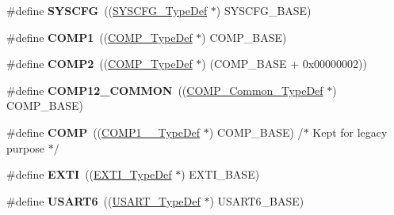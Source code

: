 \begin{DoxyCompactItemize}
\item 
\mbox{\label{group___peripheral__declaration_ga3c833fe1c486cb62250ccbca32899cb8}} 
\#define {\bfseries S\+Y\+S\+C\+FG}~((\hyperlink{struct_s_y_s_c_f_g___type_def}{S\+Y\+S\+C\+F\+G\+\_\+\+Type\+Def} $\ast$) S\+Y\+S\+C\+F\+G\+\_\+\+B\+A\+SE)
\item 
\mbox{\label{group___peripheral__declaration_gaf5713f83009027d48805b049d55bb01b}} 
\#define {\bfseries C\+O\+M\+P1}~((\hyperlink{struct_c_o_m_p___type_def}{C\+O\+M\+P\+\_\+\+Type\+Def} $\ast$) C\+O\+M\+P\+\_\+\+B\+A\+SE)
\item 
\mbox{\label{group___peripheral__declaration_ga6985fa7e9bb3c2edf15b29b7af210a2b}} 
\#define {\bfseries C\+O\+M\+P2}~((\hyperlink{struct_c_o_m_p___type_def}{C\+O\+M\+P\+\_\+\+Type\+Def} $\ast$) (C\+O\+M\+P\+\_\+\+B\+A\+SE + 0x00000002))
\item 
\mbox{\label{group___peripheral__declaration_ga7c0dbc759386dc94597d1ab7b798e75f}} 
\#define {\bfseries C\+O\+M\+P12\+\_\+\+C\+O\+M\+M\+ON}~((\hyperlink{struct_c_o_m_p___common___type_def}{C\+O\+M\+P\+\_\+\+Common\+\_\+\+Type\+Def} $\ast$) C\+O\+M\+P\+\_\+\+B\+A\+SE)
\item 
\mbox{\label{group___peripheral__declaration_ga076912543697dbe4c46b79e8e44ad2fb}} 
\#define {\bfseries C\+O\+MP}~((\hyperlink{struct_c_o_m_p1__2___type_def}{C\+O\+M\+P1\+\_\+\_\+\+Type\+Def} $\ast$) C\+O\+M\+P\+\_\+\+B\+A\+SE) /$\ast$ Kept for legacy purpose $\ast$/
\item 
\mbox{\label{group___peripheral__declaration_ga9189e770cd9b63dadd36683eb9843cac}} 
\#define {\bfseries E\+X\+TI}~((\hyperlink{struct_e_x_t_i___type_def}{E\+X\+T\+I\+\_\+\+Type\+Def} $\ast$) E\+X\+T\+I\+\_\+\+B\+A\+SE)
\item 
\mbox{\label{group___peripheral__declaration_ga2dab39a19ce3dd05fe360dcbb7b5dc84}} 
\#define {\bfseries U\+S\+A\+R\+T6}~((\hyperlink{struct_u_s_a_r_t___type_def}{U\+S\+A\+R\+T\+\_\+\+Type\+Def} $\ast$) U\+S\+A\+R\+T6\+\_\+\+B\+A\+SE)
\item 

\end{DoxyCompactItemize}
